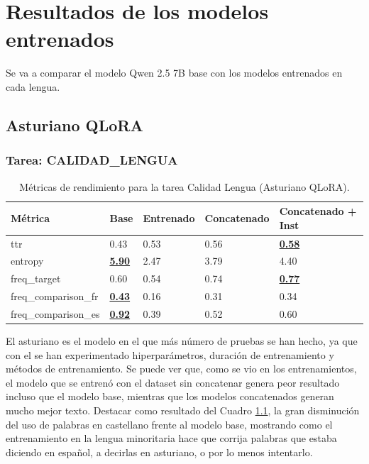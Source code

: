 \chapter{Resultados de los modelos entrenados}
\label{ch:Resultados QLoRA}

Se va a comparar el modelo Qwen 2.5 7B base con los modelos entrenados en cada lengua. 

\section{Asturiano QLoRA}

\subsection{Tarea: CALIDAD\_LENGUA}\label{tarea-calidad_lengua}
\begin{longtable}[]{@{}lllll@{}}
\toprule\noalign{}
Métrica & Base & Entrenado & Concatenado & Concatenado + Inst \\
\midrule\noalign{}
\endhead
\bottomrule\noalign{}
\caption{Métricas de rendimiento para la tarea Calidad Lengua (Asturiano QLoRA).}
\label{tab:metricas_calidad_lengua_Asturiano QLoRA}
\endlastfoot
ttr & 0.43 & 0.53 & 0.56 & \textbf{\underline{0.58}} \\
entropy & \textbf{\underline{5.90}} & 2.47 & 3.79 & 4.40 \\
freq\_target & 0.60 & 0.54 & 0.74 & \textbf{\underline{0.77}} \\
freq\_comparison\_fr & \textbf{\underline{0.43}} & 0.16 & 0.31 & 0.34 \\
freq\_comparison\_es & \textbf{\underline{0.92}} & 0.39 & 0.52 & 0.60 \\
\end{longtable}

El asturiano es el modelo en el que más número de pruebas se han hecho, ya que con el se han experimentado hiperparámetros, duración de entrenamiento y métodos de entrenamiento. Se puede ver que, como se vio en los entrenamientos, el modelo que se entrenó con el dataset sin concatenar genera peor resultado incluso que el modelo base, mientras que los modelos concatenados generan mucho mejor texto. Destacar como resultado del Cuadro \ref{tab:metricas_calidad_lengua_Asturiano QLoRA}, la gran disminución del uso de palabras en castellano frente al modelo base, mostrando como el entrenamiento en la lengua minoritaria hace que corrija palabras que estaba diciendo en español, a decirlas en asturiano, o por lo menos intentarlo.

